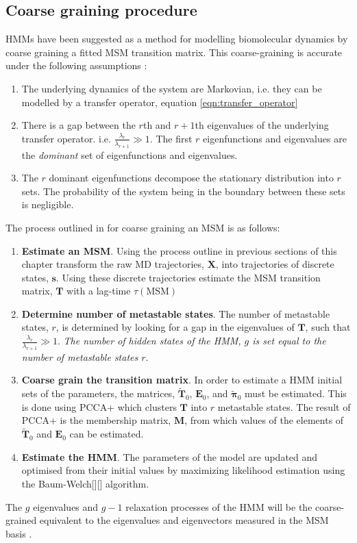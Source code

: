 \subsection{Coarse graining procedure}
HMMs have been suggested as a method for modelling biomolecular dynamics by coarse graining a fitted MSM transition matrix\cite{noeProjectedHiddenMarkov2013a}. This coarse-graining is accurate under the following assumptions \cite{noeProjectedHiddenMarkov2013a}: 
\begin{enumerate}
    \item The underlying dynamics of the system are Markovian, i.e. they can be modelled by a transfer operator, equation \ref{eqn:transfer_operator}
    \item There is a gap between the $r$th and $r+1$th  eigenvalues of the underlying transfer operator. i.e. $\frac{\lambda_{r}}{\lambda_{r+1}} \gg 1$. The first $r$ eigenfunctions and eigenvalues are the \emph{dominant} set of eigenfunctions and eigenvalues. \label{assump_two}
    \item The $r$ dominant eigenfunctions decompose the stationary distribution into $r$ sets. The probability of the system being in the boundary between these sets is negligible. \label{assump_three}
\end{enumerate}
The process outlined in \cite{noeProjectedHiddenMarkov2013a} for coarse graining an MSM is as follows: 
\begin{enumerate}
    \item \textbf{Estimate an MSM}. Using the process outline in previous sections of this chapter transform the raw MD trajectories, $\mathbf{X}$, into trajectories of discrete states, $\mathbf{s}$. Using these discrete trajectories estimate the MSM transition matrix, $\mathbf{T}$ with a lag-time $\tau(\mathrm{MSM})$
    \item \textbf{Determine number of metastable states}. The number of metastable states, $r$, is determined by looking for a gap in the eigenvalues of $\mathbf{T}$, such that  $\frac{\lambda_{r}}{\lambda_{r+1}} \gg 1$. \emph{The number of hidden states of the HMM, $g$ is set equal to the number of metastable states $r$}. 
    \item \textbf{Coarse grain the transition matrix}. In order to estimate a HMM initial sets of the parameters, the matrices, $\widetilde{\mathbf{T}}_{0}$,  $\mathbf{E}_{0}$, and $\widetilde{\bm{\pi}}_{0}$ must be estimated. This is done using PCCA+ \cite{deuflhardRobustPerronCluster2005b} which clusters $\mathbf{T}$ into $r$ metastable states. The result of PCCA+ is the membership matrix, $\mathbf{M}$, from which values of the elements of $\widetilde{\mathbf{T}}_{0}$ and $\mathbf{E}_{0}$ can be estimated. 
    \item \textbf{Estimate the HMM}. The parameters of the model are updated and optimised from their initial values by maximizing likelihood estimation using the Baum-Welch[][] algorithm. 
\end{enumerate}
The $g$ eigenvalues and $g-1$ relaxation processes of the HMM will be the coarse-grained equivalent to the  eigenvalues and eigenvectors measured in the MSM basis \cite{noeProjectedHiddenMarkov2013a}. 

